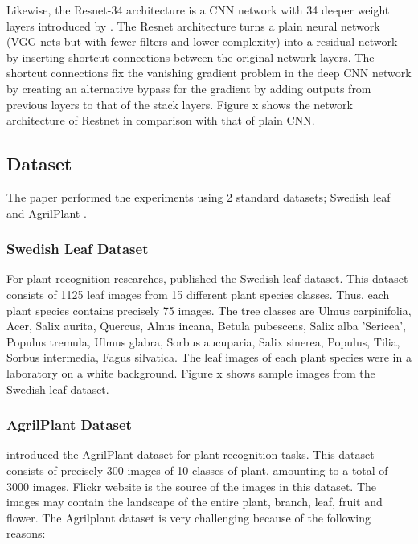 \documentclass[conference]{IEEEtran}
\begin{document}
Likewise, the Resnet-34 architecture is a CNN network with 34 deeper weight layers introduced by \cite{he2016deep}. The Resnet architecture turns a plain neural network (VGG nets but with fewer filters and lower complexity) into a residual network by inserting shortcut connections between the original network layers. The shortcut connections fix the vanishing gradient problem in the deep CNN network by creating an alternative bypass for the gradient by adding outputs from previous layers to that of the stack layers. Figure x shows the network architecture of Restnet in comparison with that of plain CNN.


\subsection{Dataset}
The paper performed the experiments using 2 standard datasets; Swedish leaf \cite{soderkvist2001computer} and AgrilPlant \cite{pawara2017comparing}.

\subsubsection{Swedish Leaf Dataset}
For plant recognition researches, \cite{soderkvist2001computer} published the Swedish leaf dataset. This dataset consists of 1125 leaf images from 15 different plant species classes. Thus, each plant species contains precisely 75 images. The tree classes are Ulmus carpinifolia, Acer, Salix aurita, Quercus, Alnus incana, Betula pubescens, Salix alba 'Sericea', Populus tremula, Ulmus glabra, Sorbus aucuparia, Salix sinerea, Populus, Tilia, Sorbus intermedia, Fagus silvatica. The leaf images of each plant species were in a laboratory on a white background. Figure x shows sample images from the Swedish leaf dataset.


\subsubsection{AgrilPlant Dataset}
 \cite{pawara2017comparing} introduced the AgrilPlant dataset for plant recognition tasks. This dataset consists of precisely 300 images of 10 classes of plant, amounting to a total of 3000 images. Flickr website is the source of the images in this dataset. The images may contain the landscape of the entire plant, branch, leaf, fruit and flower. The Agrilplant dataset is very challenging because of the following reasons:
 
\end{document}
